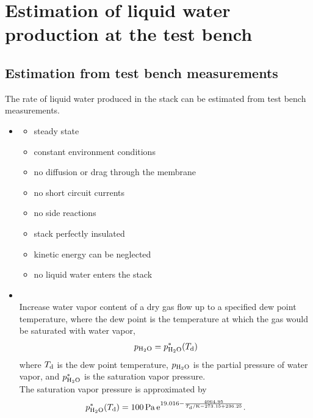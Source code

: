 \section{Estimation of liquid water production at the test bench}
%
%
\subsection{Estimation from test bench measurements}
%
The rate of liquid water produced in the stack can be estimated from test bench measurements.
%
\begin{itemize}
   \item {}
     \begin{itemize}
        \item steady state
        \item constant environment conditions
        \item no diffusion or drag through the membrane
        \item no short circuit currents
        \item no side reactions
        \item stack perfectly insulated
        \item kinetic energy can be neglected
        \item no liquid water enters the stack
     \end{itemize}
   \item {}\\ Increase water vapor content of a dry gas flow up to a specified dew point temperature, where the dew point is the temperature at which the gas would be saturated with water vapor, \ie
        \begin{align}
         p_{\mathrm{H_2O}}=p_{\mathrm{H_2O}}^{\mathrm{\ast}}(T_{\mathrm{d}})
        \end{align}
       where $T_{\mathrm{d}}$ is the dew point temperature, $p_{\mathrm{H_2O}}$ is the partial pressure of water vapor, and $p_{\mathrm{H_2O}}^{\mathrm{\ast}}$ is the saturation vapor pressure.\\
       The saturation vapor pressure is approximated by
%        
       \begin{align}
        p_\vl{H_2O}^\vl{\ast}(T_\vl{d}) = 100\,\vl{Pa}\, \eu^{19.016 - \frac{4064.95 }{ T_\vl{d}/\vl{K} - 273.15 + 236.25}}.

\end{align}
\end{itemize}
